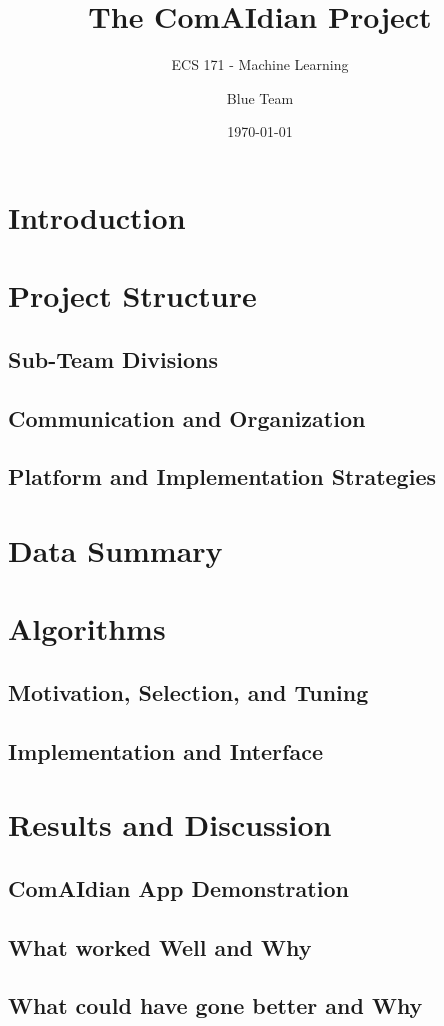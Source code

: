 \documentclass[egregdoesnotlikesansseriftitles]{scrartcl}
\author{Blue Team}
\date{\today}
\title{The ComAIdian Project}
\subtitle{ECS 171 - Machine Learning}
\begin{document}
	\maketitle
	\thispagestyle{empty}
	\setcounter{page}{0}
	\tableofcontents
	
	\pagebreak
	
	\section{Introduction}
	
	
	\section{Project Structure}
		\subsection{Sub-Team Divisions}
		
		\subsection{Communication and Organization}
		
		\subsection{Platform and Implementation Strategies}
		
	\section{Data Summary} %

	\section{Algorithms}
		\subsection{Motivation, Selection, and Tuning} %
		
		\subsection{Implementation and Interface} %

	\section{Results and Discussion}
		\subsection{ComAIdian App Demonstration}
		
		\subsection{What worked Well and Why}
		
		\subsection{What could have gone better and Why}
		
	
	
	
	
	
\end{document}

